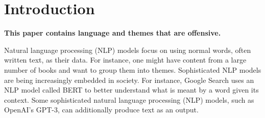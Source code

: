 \documentclass{bmcart}
\begin{document}
\begin{frontmatter}
\begin{abstractbox}
\begin{keyword}
\end{keyword}


\end{abstractbox}
%

\end{frontmatter}



\section{Introduction}\label{introduction}

\textbf{This paper contains language and themes that are offensive.}

Natural language processing (NLP) models focus on using normal words, often written text, as their data. For instance, one might have content from a large number of books and want to group them into themes. Sophisticated NLP models are being increasingly embedded in society. For instance, Google Search uses an NLP model called BERT to better understand what is meant by a word given its context. Some sophisticated natural language processing (NLP) models, such as OpenAI's GPT-3, can additionally produce text as an output.
\end{document}
